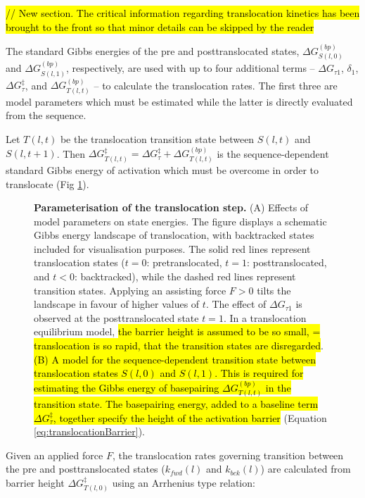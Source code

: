 \documentclass[10pt,letterpaper]{article}
\begin{document}
\textcolor{red}{\hl{ // New section. The critical information regarding translocation kinetics has been brought to the front so that minor details can be skipped by the reader}}



The standard Gibbs energies of the pre and posttranslocated states, $\Delta G^{(bp)}_{S(l,0)}$  and  $\Delta G^{(bp)}_{S(l,1)}$, respectively, are used with up to four additional terms -- $\Delta G_{\tau 1}$, $\delta_1$, $\Delta G^\ddag_{\tau}$, and $\Delta G_{T(l,t)}^{(bp)}$ --  to calculate the translocation rates. The first three are model parameters which must be estimated while the latter is directly evaluated from the sequence.



Let $T(l,t)$ be the translocation transition state between $S(l,t)$ and $S(l,t+1)$. Then $\Delta G_{T(l,t)}^{\ddag} = \Delta G^\ddag_{\tau} + \Delta G_{T(l,t)}^{(bp)}$ is the sequence-dependent standard Gibbs energy of activation which must be overcome in order to translocate (Fig \ref{fig3}).


\begin{figure}[!h]
\caption{\textbf{Parameterisation of the translocation step.}
(A) Effects of model parameters on state energies. The figure displays a schematic Gibbs energy landscape of translocation, with backtracked states included for visualisation purposes. The solid red lines represent translocation states ($t=0$: pretranslocated, $t=1$: posttranslocated, and $t<0$: backtracked), while the dashed red lines represent transition states. Applying an assisting force $F>0$ tilts the landscape in favour of higher values of $t$. The effect of $\Delta G_{\tau 1}$ is observed at the posttranslocated state $t=1$. In a translocation equilibrium model, \hl{the barrier height is assumed to be so small, = translocation is so rapid, that the transition states are disregarded}.  \hl{(B) A model for the sequence-dependent transition state between translocation states $S(l,  0)$ and $S(l,  1)$. This is required for estimating the Gibbs energy of basepairing $\Delta G_{T(l,t)}^{(bp)}$ in the transition state. The basepairing energy, added to a baseline term $\Delta G^\ddag_{\tau}$, together specify the height of the activation barrier  } (Equation \ref{eq:translocationBarrier}). }
\label{fig3}
\end{figure}





Given an applied force $F$, the translocation rates governing transition between the pre and posttranslocated states ($k_{fwd}(l)$ and $k_{bck}(l)$) are calculated from barrier height $\Delta G_{T(l,0)}^{\ddag}$ using an Arrhenius type relation:
\end{document}
